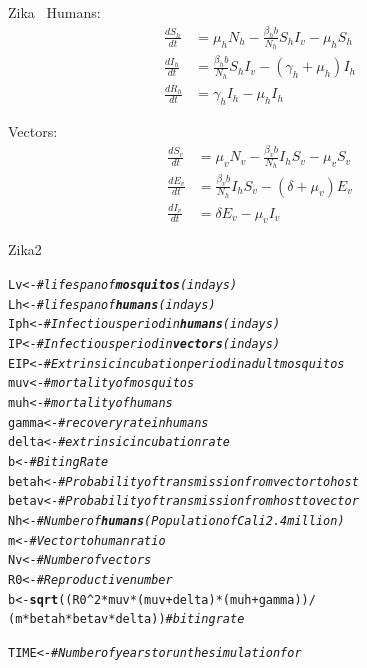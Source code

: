 \documentclass{beamer}\usepackage[]{graphicx}\usepackage[]{color}
\makeatletter
\newcommand{\hlcom}[1]{\textcolor[rgb]{0.678,0.584,0.686}{\textit{#1}}}%
\newcommand{\hlkwd}[1]{\textcolor[rgb]{0.737,0.353,0.396}{\textbf{#1}}}%
\newenvironment{kframe}{%
 \def\at@end@of@kframe{}%
 \ifinner\ifhmode%
  \def\at@end@of@kframe{\end{minipage}}%
  \begin{minipage}{\columnwidth}%
 \fi\fi%
 \def\FrameCommand##1{\hskip\@totalleftmargin \hskip-\fboxsep
 \colorbox{shadecolor}{##1}\hskip-\fboxsep
     \hskip-\linewidth \hskip-\@totalleftmargin \hskip\columnwidth}%
 \MakeFramed {\advance\hsize-\width
   \@totalleftmargin\z@ \linewidth\hsize
   \@setminipage}}%
 {\par\unskip\endMakeFramed%
 \at@end@of@kframe}
\newenvironment{knitrout}{}{} %
\makeatother
\begin{document}
\begin{frame}[fragile]{Zika~\cite{ferguson2016}} %
Humans:
\begin{align*}
\frac{dS_h}{dt} &= \mu_h N_h - \frac {\beta_h b}{N_h} S_h  I_v - \mu_h  S_h \\
\frac{dI_h}{dt} &= \frac {\beta_h b}{N_h}S_h I_v - (\gamma_h + \mu_h) I_h \\
\frac{dR_h}{dt} &= \gamma_h I_h  - \mu_h I_h
\end{align*}

Vectors:
\begin{align*}
\frac{dS_v}{dt} &= \mu_v N_v  - \frac{\beta_v b} {N_h} I_h S_v - \mu_v S_v \\
\frac{dE_v}{dt} &= \frac{\beta_v b} {N_h} I_h S_v - (\delta + \mu_v) E_v \\
\frac{dI_v}{dt} &= \delta E_v - \mu_v I_v
\end{align*}
\end{frame}

\begin{frame}[fragile]{Zika2} %
\begin{knitrout}\scriptsize
{}\color{fgcolor}\begin{kframe}
\begin{alltt}
Lv       <-        \hlcom{# life span of \hlkwd{mosquitos} (in days)}
Lh       <-        \hlcom{# life span of \hlkwd{humans} (in days)}
Iph      <-        \hlcom{# Infectious period in \hlkwd{humans} (in days)}
IP       <-        \hlcom{# Infectious period in \hlkwd{vectors} (in days)}
EIP      <-        \hlcom{# Extrinsic incubation period in adult mosquitos}
muv      <-        \hlcom{# mortality of mosquitos}
muh      <-        \hlcom{# mortality of humans}
gamma    <-        \hlcom{# recovery rate in humans}
delta    <-        \hlcom{# extrinsic incubation rate}
b        <-        \hlcom{# Biting Rate}
betah    <-        \hlcom{# Probability of transmission from vector to host}
betav    <-        \hlcom{# Probability of transmission from host to vector}
Nh       <-        \hlcom{# Number of \hlkwd{humans} (Population of Cali 2.4 million)}
m        <-        \hlcom{# Vector to human ratio}
Nv       <-        \hlcom{# Number of vectors}
R0       <-        \hlcom{# Reproductive number}
b        <-        \hlkwd{sqrt}((R0 ^2 * muv*(muv+delta) * (muh+gamma)) /
                   (m * betah * betav * delta)) \hlcom{# biting rate}

TIME     <-        \hlcom{# Number of years to run the simulation for }
\end{alltt}
\end{kframe}
\end{knitrout}

\end{frame}
\end{document}
